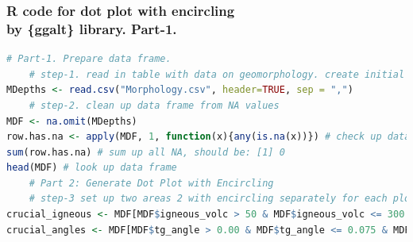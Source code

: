 \documentclass[pdflatex,compress,10pt,
	xcolor={dvipsnames,dvipsnames,svgnames,x11names,table},
	hyperref={colorlinks = true,breaklinks = true, urlcolor = NavyBlue, breaklinks = true}]{beamer}
\begin{document}
\begin{frame}[fragile,shrink=20,]\frametitle{R code for dot plot with encircling \\by \{ggalt\} library. Part-1.}
\begin{lstlisting}[language=R]
	# Part-1. Prepare data frame. 
	# step-1. read in table with data on geomorphology. create initial data frame
MDepths <- read.csv("Morphology.csv", header=TRUE, sep = ",")
	# step-2. clean up data frame from NA values
MDF <- na.omit(MDepths) 
row.has.na <- apply(MDF, 1, function(x){any(is.na(x))}) # check up data frame if there are any NA
sum(row.has.na) # sum up all NA, should be: [1] 0
head(MDF) # look up data frame
	# Part 2: Generate Dot Plot with Encircling
	# step-3 set up two areas 2 with encircling separately for each plot
crucial_igneous <- MDF[MDF$igneous_volc > 50 & MDF$igneous_volc <= 300 & MDF$profile > 5 & MDF$profile <= 25, ]
crucial_angles <- MDF[MDF$tg_angle > 0.00 & MDF$tg_angle <= 0.075 & MDF$profile > 5 & MDF$profile <= 22, ]


\end{lstlisting}
\end{frame}
\end{document}
